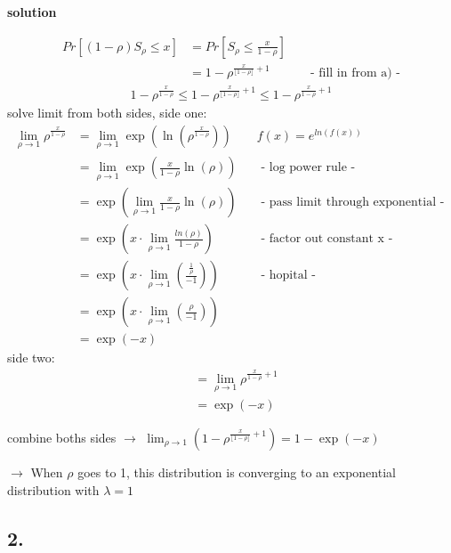 \textbf{solution}

\begin{align*}
Pr\left[\left(1-\rho \right)S_{\rho }\le x\right]&=Pr\left[S_{\rho }\le \frac{x}{1-\rho }\right]\\
&=1-\rho ^{{\frac{x}{\lfloor1-\rho \rfloor}+1}} && \text{ - fill in from a) -}
\end{align*}
\begin{align*}
1-\rho ^{{\frac{x}{1-\rho }}}\le 1-\rho ^{{\frac{x}{\lfloor1-\rho \rfloor}+1}}\le 1-\rho ^{{\frac{x}{1-\rho }+1}}
\end{align*}
solve limit from both sides, side one:
\begin{align*}
\lim_{{\rho \rightarrow 1}}\rho ^{{\frac{x}{1-\rho }}}&=\lim_{{\rho \rightarrow 1}}\exp\left(\ln\left(\rho^{\frac{x}{1-\rho }} \right)\right) &&
\text{$f(x)=e^{ln(f(x))}$}\\
&= \lim_{{\rho \rightarrow 1}}\exp\left(\frac{x}{1-\rho }\ln\left(\rho \right)\right) && \text{ - log power rule - }\\
&= \exp\left(\lim_{{\rho \rightarrow 1}}\frac{x}{1-\rho }\ln\left(\rho \right)\right) && \text{ - pass limit through exponential - }\\
&= \exp\left(x \cdot \lim_{{\rho \rightarrow 1}}\frac{ln(\rho)}{1-\rho }\right) && \text{ - factor out constant x - }\\
&=\exp\left(x \cdot \lim_{{\rho \rightarrow 1}}\left(\frac{\frac{1}{\rho }}{-1}\right)\right) && \text{ - hopital - }\\
&=\exp\left(x \cdot \lim_{{\rho \rightarrow 1}}\left(\frac{\rho }{-1}\right)\right)\\
&=\exp\left(-x\right)
\end{align*}
side two:
\begin{align*}
&=\lim_{{\rho \rightarrow 1}} \rho ^{{\frac{x}{1-\rho }+1}}\\
&=\exp\left(-x\right)
\end{align*}

combine boths sides $\rightarrow$ $\lim_{{\rho \rightarrow 1}}\left(1-\rho ^{{\frac{x}{\lfloor1-\rho \rfloor}+1}}\right)=1-\exp\left(-x\right)$

$\rightarrow$ When $\rho $ goes to 1, this distribution is converging to an exponential
distribution with $\lambda = 1$

\subsection*{ 2. }

